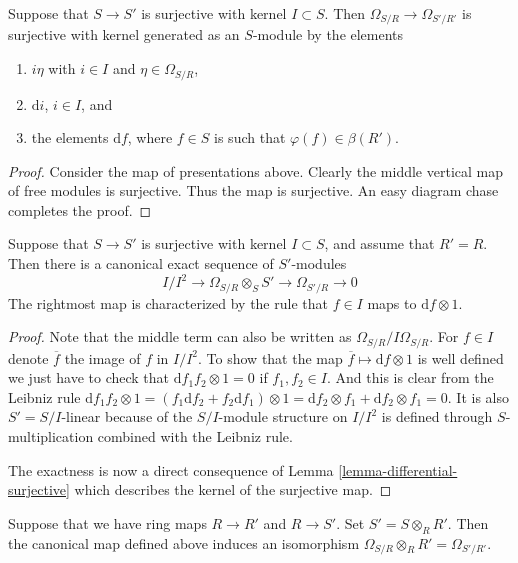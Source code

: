 \begin{lemma}
\label{lemma-differential-surjective}
Suppose that $S \to S'$ is surjective with kernel $I \subset S$.
Then $\Omega_{S/R} \to \Omega_{S'/R'}$ is surjective with
kernel generated as an $S$-module by the elements 
\begin{enumerate}
\item $i\eta$ with $i\in I$ and $\eta \in \Omega_{S/R}$,
\item $\text{d}i$, $i \in I$, and
\item the elements $\text{d}f$, where $f \in S$ is
such that $\varphi(f) \in \beta(R')$.
\end{enumerate}
\end{lemma}

\begin{proof}
Consider the map of presentations above. Clearly the middle vertical
map of free modules is surjective. Thus the map is surjective.
An easy diagram chase completes the proof.
\end{proof}

\begin{lemma}
\label{lemma-differential-seq}
Suppose that $S \to S'$ is surjective with kernel $I \subset S$,
and assume that $R' = R$.
Then there is a canonical exact sequence of $S'$-modules
$$
I/I^2 
\longrightarrow
\Omega_{S/R}\otimes_S S'
\longrightarrow
\Omega_{S'/R}
\longrightarrow
0
$$
The rightmost map is characterized by the rule that
$f \in I$ maps to $\text{d}f \otimes 1$.
\end{lemma}

\begin{proof}
Note that the middle term can also be written as 
$\Omega_{S/R}/I\Omega_{S/R}$. For $f \in I$ denote
$\overline{f}$ the image of $f$ in $I/I^2$.
To show that the map $\overline{f} \mapsto \text{d}f \otimes 1$
is well defined we just have to check that
$\text{d} f_1f_2 \otimes 1 = 0$ if $f_1, f_2 \in I$. 
And this is clear from the Leibniz rule 
$\text{d} f_1f_2 \otimes 1
=
(f_1 \text{d}f_2 + f_2 \text{d} f_1 )\otimes 1
=
\text{d}f_2 \otimes f_1 + \text{d}f_2 \otimes f_1
=
0$. It is also $S' = S/I$-linear because of the $S/I$-module
structure on $I/I^2$ is defined through $S$-multiplication 
combined with the Leibniz rule.

\medskip\noindent
The exactness is now a direct consequence of
Lemma \ref{lemma-differential-surjective}
which describes the kernel of the surjective map.
\end{proof}

\begin{lemma}
\label{lemma-differentials-base-change}
Suppose that we have ring maps $R \to R'$ and $R \to S'$.
Set $S' = S\otimes_R R'$. Then the canonical map defined above
induces an isomorphism $\Omega_{S/R} \otimes_R R' = \Omega_{S'/R'}$.
\end{lemma}

